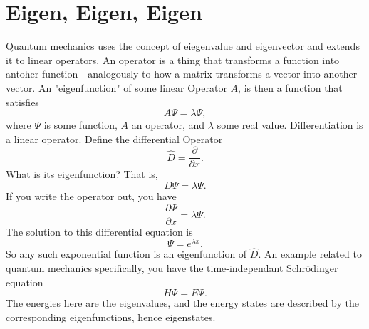 \section{Eigen, Eigen, Eigen}
Quantum mechanics uses the concept of eiegenvalue and eigenvector and
extends it to linear operators. An operator is a thing that transforms
a function into antoher function - analogously to how a matrix
transforms a vector into another vector. An "eigenfunction" of some
linear Operator $A$, is then a function that satisfies
\begin{equation}
  \label{eq:5}
  A \Psi = \lambda \Psi,
\end{equation}
where $\Psi$ is some function, $A$ an operator, and $\lambda$ some
real value.
Differentiation is a linear operator. Define the differential Operator
\begin{equation}
  \label{eq:6}
  \hat{D} = \frac{\partial}{\partial x}.
\end{equation}
What is its eigenfunction? That is,
\begin{equation}
  \label{eq:7}
  D \Psi = \lambda \Psi.
\end{equation}
If you write the operator out, you have
\begin{equation}
  \label{eq:8}
  \frac{\partial \Psi}{\partial x} = \lambda \Psi.
\end{equation}
The solution to this differential equation is
\begin{equation}
  \label{eq:9}
  \Psi = e^{\lambda x}.
\end{equation}
So any such exponential function is an eigenfunction of $\hat{D}$.
An example related to quantum mechanics specifically, you have the
time-independant Schrödinger equation
\begin{equation}
  \label{eq:10}
  H \Psi = E \Psi.
\end{equation}
The energies here are the eigenvalues, and the energy states are
described by the corresponding eigenfunctions, hence eigenstates.
